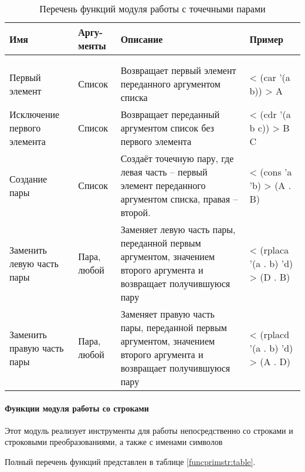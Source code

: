 \begin{xltabular}{\textwidth}{|p{3.6cm}|p{1.8cm}|p{6cm}|X|}
	\caption{Перечень функций модуля работы с точечными парами\label{funcprimpair:table}}\\ \hline
	\centrow Имя & \centrow Аргу- \linebreak менты & \centrow Описание & \centrow Пример \\ \hline
	 &  &  &  \\ \hline
	\endfirsthead
	 &  &  &  \\ \hline
	\finishhead
	Первый элемент & Список & Возвращает первый элемент переданного аргументом списка & < (car '(a b)) \linebreak > A \\ \hline 
	Исключение первого элемента & Список & Возвращает переданный аргументом список без первого элемента & < (cdr '(a b c)) \linebreak > B C \\ \hline 
	Создание пары & Список & Создаёт точечную пару, где левая часть -- первый элемент переданного аргументом списка, правая -- второй. & < (cons 'a 'b) \linebreak > (A . B) \\ \hline 
	Заменить левую часть пары & Пара, любой & Заменяет левую часть пары, переданной первым аргументом, значением второго аргумента и возвращает получившуюся пару & < (rplaca '(a . b) 'd) \linebreak > (D . B) \\ \hline 
	Заменить правую часть пары & Пара, любой & Заменяет правую часть пары, переданной первым аргументом, значением второго аргумента и возвращает получившуюся пару & < (rplacd '(a . b) 'd) \linebreak > (A . D)
	
\end{xltabular}

\paragraph{Функции модуля работы со строками}

Этот модуль реализует инструменты для работы непосредственно со строками и строковыми преобразованиями, а также с именами символов

Полный перечень функций представлен в таблице \ref{funcprimstr:table}.

